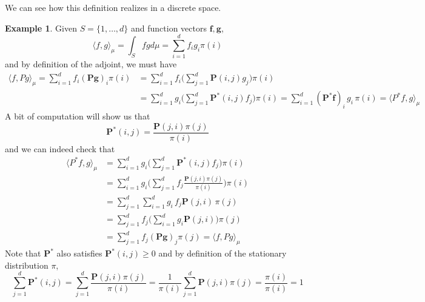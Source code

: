 \documentclass{article}
\theoremstyle{definition}
\newtheorem{example}{Example}[section]
\theoremstyle{remark}
\theoremstyle{definition}
\begin{document}
      We can see how this definition realizes in a discrete space. 

      \begin{example}
      Given $S = \{1, \ldots, d\}$ and function vectors $\mathbf{f}, \mathbf{g}$, 
      \[\langle f, g \rangle_\mu = \int_S f g d\mu = \sum_{i=1}^d f_i g_i \pi(i)\]
      and by definition of the adjoint, we must have 
      \begin{align*}
          \langle f, P g \rangle_\mu = \sum_{i=1}^d f_i (\mathbf{P} \mathbf{g})_i \pi(i) & = \sum_{i=1}^d f_i \bigg( \sum_{j=1}^d \mathbf{P}(i, j) g_j \bigg) \pi(i) \\
          & = \sum_{i=1}^d g_i \bigg( \sum_{j=1}^d \mathbf{P}^* (i, j) f_j \bigg) \pi(i) = \sum_{i=1}^d (\mathbf{P}^* \mathbf{f})_i \, g_i \, \pi(i) = \langle P^* f, g \rangle_\mu 
      \end{align*}
      A bit of computation will show us that 
      \[\mathbf{P}^*(i, j) = \frac{\mathbf{P}(j, i) \pi(j)}{\pi(i)}\]
      and we can indeed check that 
      \begin{align*}
          \langle P^* f, g \rangle_\mu  & = \sum_{i=1}^d g_i \bigg( \sum_{j=1}^d \mathbf{P}^* (i, j) f_j \bigg) \pi(i) \\
          & = \sum_{i=1}^d g_i \bigg( \sum_{j=1}^d f_j \frac{\mathbf{P}(j, i) \pi(j)}{\pi(i)} \bigg) \pi(i) \\
          & = \sum_{j=1}^d \sum_{i=1}^d g_i \, f_j \mathbf{P}(j, i) \, \pi(j) \\
          & = \sum_{j=1}^d f_j \bigg( \sum_{i=1}^d g_i \mathbf{P}(j, i) \bigg) \pi(j) \\
          & = \sum_{j=1}^d f_j (\mathbf{P} \mathbf{g})_j \pi(j) = \langle f, P g \rangle_\mu
      \end{align*}
      Note that $\mathbf{P}^*$ also satisfies $\mathbf{P}^* (i, j) \geq 0$ and by definition of the stationary distribution $\pi$, 
      \[\sum_{j=1}^d \mathbf{P}^* (i, j) = \sum_{j=1}^d \frac{\mathbf{P}(j, i) \pi(j)}{\pi(i)} = \frac{1}{\pi(i)} \sum_{j=1}^d \mathbf{P}(j, i) \pi(j) = \frac{\pi(i)}{\pi(i)} = 1 \]
      \end{example}
\end{document}
